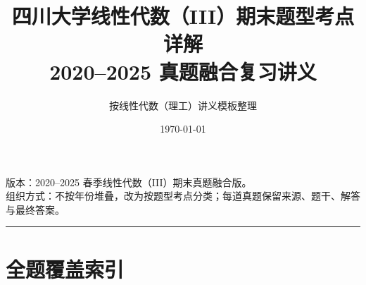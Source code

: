 \documentclass[11pt,a4paper,UTF8]{ctexart}
\title{\Huge 四川大学线性代数（III）期末题型考点详解\\[0.25em]
\Large 2020--2025 真题融合复习讲义}
\author{按线性代数（理工）讲义模板整理}
\date{\today}
\begin{document}
\maketitle
\thispagestyle{empty}
\tableofcontents
\newpage

\begin{scorebox}[定位]
版本：2020--2025 春季线性代数（III）期末真题融合版。\\
组织方式：不按年份堆叠，改为按题型考点分类；每道真题保留来源、题干、解答与最终答案。
\end{scorebox}

\bigskip\hrule\bigskip

\section{全题覆盖索引}
\end{document}
